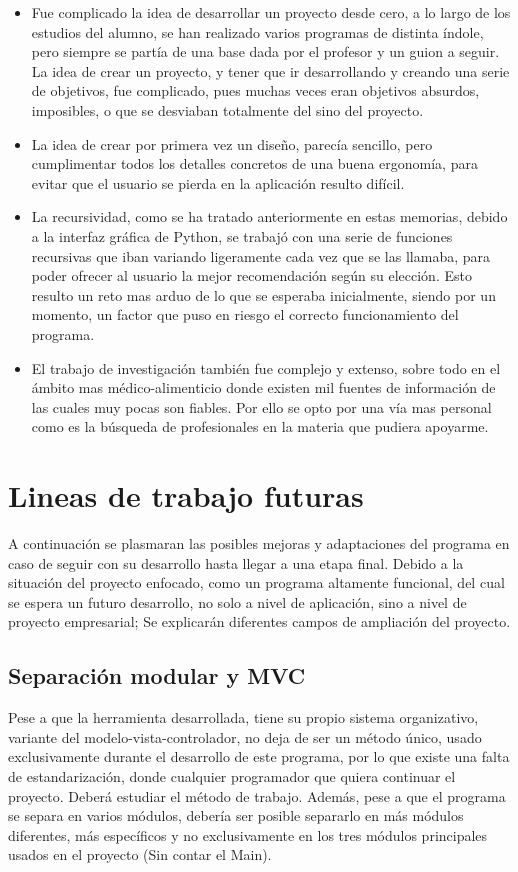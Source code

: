 \begin{itemize}
\item	Fue complicado la idea de desarrollar un proyecto desde cero, a lo largo de los estudios del alumno, se han realizado varios programas de distinta índole, pero siempre se partía de una base dada por el profesor y un guion a seguir. La idea de crear un proyecto, y tener que ir desarrollando y creando una serie de objetivos, fue complicado, pues muchas veces eran objetivos absurdos, imposibles, o que se desviaban totalmente del sino del proyecto.
\item	La idea de crear por primera vez un diseño, parecía sencillo, pero cumplimentar todos los detalles concretos de una buena ergonomía, para evitar que el usuario se pierda en la aplicación resulto difícil.
\item	La recursividad, como se ha tratado anteriormente en estas memorias, debido a la interfaz gráfica de Python, se trabajó con una serie de funciones recursivas que iban variando ligeramente cada vez que se las llamaba, para poder ofrecer al usuario la mejor recomendación según su elección. Esto resulto un reto mas arduo de lo que se esperaba inicialmente, siendo por un momento, un factor que puso en riesgo el correcto funcionamiento del programa.
\item	El trabajo de investigación también fue complejo y extenso, sobre todo en el ámbito mas médico-alimenticio donde existen mil fuentes de información de las cuales muy pocas son fiables. Por ello se opto por una vía mas personal como es la búsqueda de profesionales en la materia que pudiera apoyarme.
\end{itemize}

\section{Lineas de trabajo futuras}
A continuación se plasmaran las posibles mejoras y adaptaciones del programa en caso de seguir con su desarrollo hasta llegar a una etapa final. Debido a la situación del proyecto enfocado, como un programa altamente funcional, del cual se espera un futuro desarrollo, no solo a nivel de aplicación, sino a nivel de proyecto empresarial; Se explicarán diferentes campos de ampliación del proyecto.
\subsection{Separación modular y MVC}
Pese a que la herramienta desarrollada, tiene su propio sistema organizativo, variante del modelo-vista-controlador, no deja de ser un método único, usado exclusivamente durante el desarrollo de este programa, por lo que existe una falta de estandarización, donde cualquier programador que quiera continuar el proyecto. Deberá estudiar el método de trabajo. Además, pese a que el programa se separa en varios módulos, debería ser posible separarlo en más módulos diferentes, más específicos y no exclusivamente en los tres módulos principales usados en el proyecto (Sin contar el Main).
